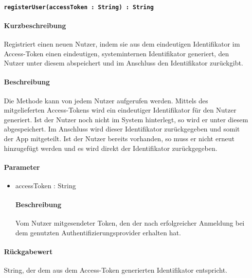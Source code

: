 \paragraph*{\texttt{registerUser(accessToken : String) : String}}%
\paragraph*{Kurzbeschreibung}
Registriert einen neuen Nutzer, indem sie aus dem eindeutigen Identifikator im Access-Token einen 
eindeutigen, systeminternen Identifikator generiert, den Nutzer unter diesem abspeichert und im Anschluss den
Identifikator zurückgibt.
\paragraph*{Beschreibung}
Die Methode kann von jedem Nutzer aufgerufen werden.
Mittels des mitgelieferten Access-Tokens wird ein eindeutiger Identifikator für den Nutzer generiert.
Ist der Nutzer noch nicht im System hinterlegt, so wird er unter diesem abgespeichert.
Im Anschluss wird dieser Identifikator zurückgegeben und somit der App mitgeteilt.
Ist der Nutzer bereits vorhanden, so muss er nicht erneut hinzugefügt werden und es wird
direkt der Identifikator zurückgegeben.
\paragraph*{Parameter}
\begin{itemize}
    \item accessToken : String
    		\paragraph*{Beschreibung}
    		Vom Nutzer mitgesendeter Token, den der nach erfolgreicher Anmeldung bei dem genutzten Authentifizierungsprovider erhalten hat.
\end{itemize}
\paragraph*{Rückgabewert}
String, der dem aus dem Access-Token generierten Identifikator entspricht.
